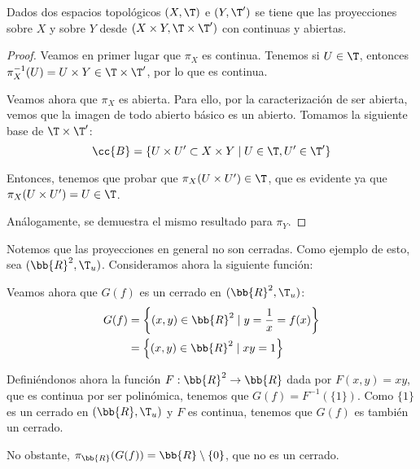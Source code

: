 \begin{prop}\label{prop:ProyeccionesContinuasAbiertas}
    Dados dos espacios topológicos $(X,\T)$ e $(Y,\T')$ se tiene que las proyecciones sobre $X$ y sobre $Y$ desde $(X\times Y, \T\times \T')$ con continuas y abiertas.
\end{prop}
\begin{proof}
    Veamos en primer lugar que $\pi_X$ es continua. Tenemos si $U\in \T$, entonces $\pi_X^{-1}(U)=U\times Y\in \T\times \T'$, por lo que es continua.

    Veamos ahora que $\pi_X$ es abierta. Para ello, por la caracterización de ser abierta, vemos que la imagen de todo abierto básico es un abierto. Tomamos la siguiente base de $\T\times \T'$:
    $$\cc{B}=\{U\times U'\subset X\times Y\mid U\in \T, U'\in \T'\}$$

    Entonces, tenemos que probar que $\pi_X(U\times U')\in \T$, que es evidente ya que $\pi_X(U\times U')=U\in \T$.

    Análogamente, se demuestra el mismo resultado para $\pi_Y$.
\end{proof}
\begin{observacion}
    Notemos que las proyecciones en general no son cerradas. Como ejemplo de esto, sea $(\bb{R}^2, \T_u)$. Consideramos ahora la siguiente función:

    Veamos ahora que $G(f)$ es un cerrado en $(\bb{R}^2, \T_u)$:
    \begin{equation*}\begin{split}
        G(f) &= \left\{(x,y)\in \bb{R}^2\mid y=\frac{1}{x}=f(x)\right\} \\
        &= \left\{(x,y)\in \bb{R}^2\mid xy=1\right\}
    \end{split}\end{equation*}

    Definiéndonos ahora la función $F:\bb{R}^2\to \bb{R}$ dada por $F(x,y)=xy$, que es continua por ser polinómica, tenemos que $G(f)=F^{-1}(\{1\})$. Como $\{1\}$ es un cerrado en $(\bb{R},\T_u)$ y $F$ es continua, tenemos que $G(f)$ es también un cerrado.

    No obstante, $\pi_\bb{R}(G(f))=\bb{R}\setminus \{0\}$, que no es un cerrado.
\end{observacion}

